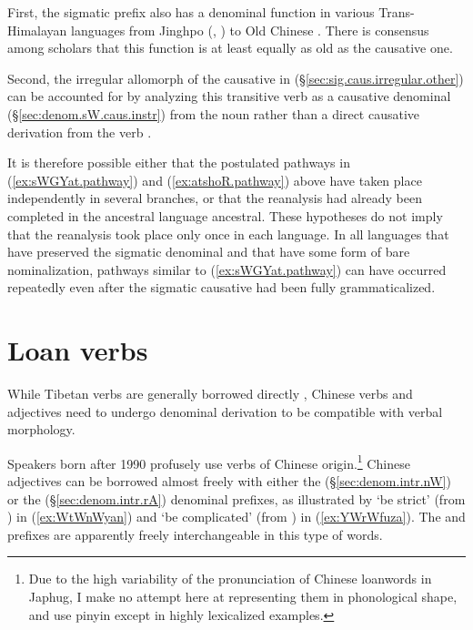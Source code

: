 First, the sigmatic prefix also has a denominal function in various Trans-Himalayan languages from Jinghpo (\citealt[72]{dai92yufa}, \citealt[88]{kurabe16jinghpo}) to Old Chinese \citep{conrady1896}. There is consensus among scholars that this function is at least equally as old as the causative one.

Second, the irregular  allomorph of the causative in  (§\ref{sec:sig.caus.irregular.other}) can be accounted for by analyzing this transitive verb as a causative denominal (§\ref{sec:denom.sW.caus.instr}) from the noun   rather than a direct causative derivation from the verb .  
 
It is therefore possible either that the postulated pathways in (\ref{ex:sWGYat.pathway}) and (\ref{ex:atshoR.pathway}) above have taken place independently in several branches, or that the reanalysis had already been completed in the ancestral language ancestral. These hypotheses do not imply that the reanalysis took place only once in each language. In all languages that have preserved the sigmatic denominal and that have some form of bare nominalization, pathways similar to (\ref{ex:sWGYat.pathway}) can have occurred repeatedly even after the sigmatic causative had been fully grammaticalized.

\section{Loan verbs} \label{sec:zh.loanverbs}
While Tibetan verbs are generally borrowed directly \citep{jacques19contact}, Chinese verbs and adjectives need to undergo denominal derivation to be compatible with verbal morphology.

Speakers born after 1990 profusely use verbs of Chinese origin.\footnote{Due to the high variability of the pronunciation of Chinese loanwords in Japhug, I make no attempt here at representing them in phonological shape, and use pinyin except in highly lexicalized examples. } Chinese adjectives can be borrowed almost freely with either the  (§\ref{sec:denom.intr.nW}) or the  (§\ref{sec:denom.intr.rA}) denominal prefixes, as illustrated by  `be strict' (from ) in (\ref{ex:WtWnWyan}) and  `be complicated' (from ) in (\ref{ex:YWrWfuza}). The  and  prefixes are apparently freely interchangeable in this type of words.

